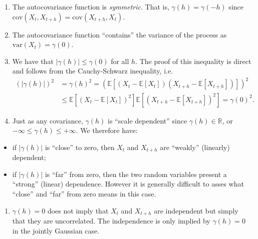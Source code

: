 \documentclass[]{book}
\providecommand{\tightlist}{%
  \setlength{\itemsep}{0pt}\setlength{\parskip}{0pt}}
\theoremstyle{definition}
\theoremstyle{definition}
\theoremstyle{definition}
\theoremstyle{remark}
\begin{document}
\begin{enumerate}
\def\labelenumi{\arabic{enumi}.}
\tightlist
\item
  The autocovariance function is \emph{symmetric}. That is,
  \({\gamma}\left( {h} \right) = {\gamma}\left( -h \right)\) since
  \(\text{cov} \left( {{X_t},{X_{t+h}}} \right) = \text{cov} \left( X_{t+h},X_{t} \right)\).
\item
  The autocovariance function ``contains'' the variance of the process
  as \(\text{var} \left( X_{t} \right) = {\gamma}\left( 0 \right)\).
\item
  We have that \(|\gamma(h)| \leq \gamma(0)\) for all \(h\). The proof
  of this inequality is direct and follows from the Cauchy-Schwarz
  inequality, i.e. \[ \begin{aligned}
    \left(|\gamma(h)| \right)^2 &= \gamma(h)^2 = \left(\mathbb{E}\left[\left(X_t - \mathbb{E}[X_t] \right)\left(X_{t+h} - \mathbb{E}[X_{t+h}] \right)\right]\right)^2\\
    &\leq \mathbb{E}\left[\left(X_t - \mathbb{E}[X_t] \right)^2 \right] \mathbb{E}\left[\left(X_{t+h} - \mathbb{E}[X_{t+h}] \right)^2 \right] =  \gamma(0)^2. 
    \end{aligned}
    \]
\item
  Just as any covariance, \({\gamma}\left( {h} \right)\) is ``scale
  dependent'' since \({\gamma}\left( {h} \right) \in \mathbb{R}\), or
  \(-\infty \le {\gamma}\left( {h} \right) \le +\infty\). We therefore
  have:
\end{enumerate}

\begin{itemize}
\tightlist
\item
  if \(\left| {\gamma}\left( {h} \right) \right|\) is ``close'' to zero,
  then \(X_t\) and \(X_{t+h}\) are ``weakly'' (linearly) dependent;
\item
  if \(\left| {\gamma}\left( {h} \right) \right|\) is ``far'' from zero,
  then the two random variables present a ``strong'' (linear)
  dependence. However it is generally difficult to asses what ``close''
  and ``far'' from zero means in this case.
\end{itemize}

\begin{enumerate}
\def\labelenumi{\arabic{enumi}.}
\setcounter{enumi}{4}
\tightlist
\item
  \({\gamma}\left( {h} \right)=0\) does not imply that \(X_t\) and
  \(X_{t+h}\) are independent but simply that they are uncorrelated. The
  independence is only implied by \({\gamma}\left( {h} \right)=0\) in
  the jointly Gaussian case.
\end{enumerate}
\end{document}
